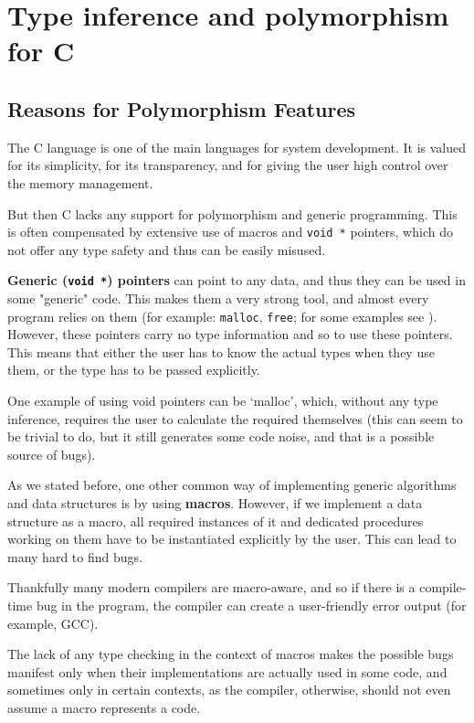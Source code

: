\chapter{Type inference and polymorphism for C}
\label{chap:infPolyC}
\newcommand{\lambdac}[1]{\ensuremath{{\llbracket #1 \rrbracket}_{\lambda_C}}}

\section{Reasons for Polymorphism Features}

The C language is one of the main languages for system development. It is valued for its simplicity, for its transparency, and for giving the user high control over the memory management.

But then C lacks any support for polymorphism and generic programming. This is often compensated by extensive use of macros and \lstinline{void *} pointers, which do not offer any type safety and thus can be easily misused.

\textbf{Generic (\lstinline{void *}) pointers} can point to any data, and thus they can be used in some "generic" code. This makes them a very strong tool, and almost every program relies on them (for example: \lstinline{malloc}, \lstinline{free}; for some examples see \cite{organisation1999iso}). However, these pointers carry no type information and so to use these pointers. This means that either the user has to know the actual types when they use them, or the type has to be passed explicitly.

One example of using void pointers can be `malloc', which, without any type inference, requires the user to calculate the required themselves (this can seem to be trivial to do, but it still generates some code noise, and that is a possible source of bugs).

As we stated before, one other common way of implementing generic algorithms and data structures is by using \textbf{macros}. However, if we implement a data structure as a macro, all required instances of it and dedicated procedures working on them have to be instantiated explicitly by the user. This can lead to many hard to find bugs.

Thankfully many modern compilers are macro-aware, and so if there is a compile-time bug in the program, the compiler can create a user-friendly error output (for example, GCC). %

The lack of any type checking in the context of macros makes the possible bugs manifest only when their implementations are actually used in some code, and sometimes only in certain contexts, as the compiler, otherwise, should not even assume a macro represents a code.

